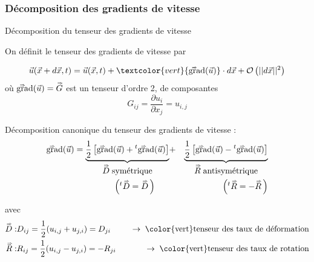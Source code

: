 \subsubsection{Décomposition des gradients de vitesse}
\begin{frame}{Décomposition du tenseur des gradients de vitesse}

\small
On définit le \textcolor{vert}{tenseur des gradients de vitesse} par

\[
	\myvec{u}(\myvec{x}+d\myvec{x}, t) 
	= \myvec{u}(\myvec{x}, t) + \textcolor{vert}{\ggradient\,(\myvec{u})} \cdot d\myvec{x} 
	+ \mathcal{O}\left(||d\myvec{x}||^2\right)
\]
où $\accentset{\Rightarrow}{\mbox{\rm gra}}\mbox{\rm d}\!\,(\vec{u}) = \accentset{\Rightarrow}{G}$ est un tenseur d'ordre 2, de composantes 
\[
	G_{ij} = \dfrac{\partial u_i}{\partial x_j} = u_{i, j}
\]

\pause

\medskip
Décomposition canonique du tenseur des gradients de vitesse :
\begin{eqnarray*}
\accentset{\Rightarrow}{\mbox{\rm gra}}\mbox{\rm d}\!\,(\vec{u}) 
= 
\underbrace{\displaystyle \frac{1}{2} \left [ \accentset{\Rightarrow}{\mbox{\rm gra}}\mbox{\rm d}\!\,(\vec{u}) + {}^t\accentset{\Rightarrow}{\mbox{\rm gra}}\mbox{\rm d}\!\,(\vec{u})
                         \right ]}_{\displaystyle \accentset{\Rightarrow}{D} \; \mbox{symétrique}}
& + &
\underbrace{\displaystyle \frac{1}{2} \left [ \accentset{\Rightarrow}{\mbox{\rm gra}}\mbox{\rm d}\!\,(\vec{u}) - {}^t\accentset{\Rightarrow}{\mbox{\rm gra}}\mbox{\rm d}\!\,(\vec{u})                          									\right ]}_{\displaystyle \accentset{\Rightarrow}{R} \; \mbox{antisymétrique}}
\\
\left ({}^t\accentset{\Rightarrow}{D}=\accentset{\Rightarrow}{D} \, \right) \hspace{6mm} 
& & 
\hspace{9mm} \left ({}^t\accentset{\Rightarrow}{R}=-\accentset{\Rightarrow}{R} \, \right )
\end{eqnarray*}

avec 
\begin{eqnarray*}
\mytensor{D} : & D_{ij} = \dfrac{1}{2} (u_{i, j} + u_{j, i}) = D_{ji} &
\quad \rightarrow \; \mbox{\color{vert}tenseur des taux de déformation}
\\
\mytensor{R} : & R_{ij} = \dfrac{1}{2} (u_{i, j} - u_{j, i}) = -R_{ji} &
\quad \rightarrow \; \mbox{\color{vert}tenseur des taux de rotation}
\end{eqnarray*}

\vspace{0mm}

\end{frame}


